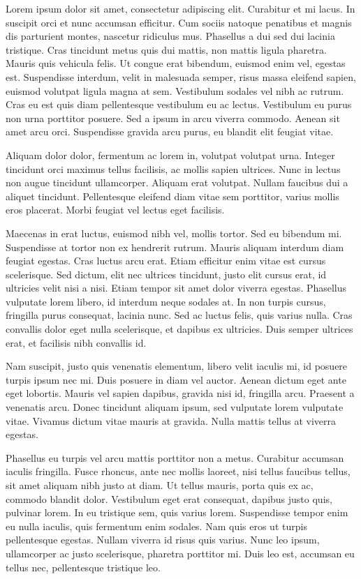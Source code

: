 Lorem ipsum dolor sit amet, consectetur adipiscing elit. Curabitur et mi lacus. In suscipit orci et nunc accumsan efficitur. Cum sociis natoque penatibus et magnis dis parturient montes, nascetur ridiculus mus. Phasellus a dui sed dui lacinia tristique. Cras tincidunt metus quis dui mattis, non mattis ligula pharetra. Mauris quis vehicula felis. Ut congue erat bibendum, euismod enim vel, egestas est. Suspendisse interdum, velit in malesuada semper, risus massa eleifend sapien, euismod volutpat ligula magna at sem. Vestibulum sodales vel nibh ac rutrum. Cras eu est quis diam pellentesque vestibulum eu ac lectus. Vestibulum eu purus non urna porttitor posuere. Sed a ipsum in arcu viverra commodo. Aenean sit amet arcu orci. Suspendisse gravida arcu purus, eu blandit elit feugiat vitae.

Aliquam dolor dolor, fermentum ac lorem in, volutpat volutpat urna. Integer tincidunt orci maximus tellus facilisis, ac mollis sapien ultrices. Nunc in lectus non augue tincidunt ullamcorper. Aliquam erat volutpat. Nullam faucibus dui a aliquet tincidunt. Pellentesque eleifend diam vitae sem porttitor, varius mollis eros placerat. Morbi feugiat vel lectus eget facilisis.

Maecenas in erat luctus, euismod nibh vel, mollis tortor. Sed eu bibendum mi. Suspendisse at tortor non ex hendrerit rutrum. Mauris aliquam interdum diam feugiat egestas. Cras luctus arcu erat. Etiam efficitur enim vitae est cursus scelerisque. Sed dictum, elit nec ultrices tincidunt, justo elit cursus erat, id ultricies velit nisi a nisi. Etiam tempor sit amet dolor viverra egestas. Phasellus vulputate lorem libero, id interdum neque sodales at. In non turpis cursus, fringilla purus consequat, lacinia nunc. Sed ac luctus felis, quis varius nulla. Cras convallis dolor eget nulla scelerisque, et dapibus ex ultricies. Duis semper ultrices erat, et facilisis nibh convallis id.

Nam suscipit, justo quis venenatis elementum, libero velit iaculis mi, id posuere turpis ipsum nec mi. Duis posuere in diam vel auctor. Aenean dictum eget ante eget lobortis. Mauris vel sapien dapibus, gravida nisi id, fringilla arcu. Praesent a venenatis arcu. Donec tincidunt aliquam ipsum, sed vulputate lorem vulputate vitae. Vivamus dictum vitae mauris at gravida. Nulla mattis tellus at viverra egestas.

Phasellus eu turpis vel arcu mattis porttitor non a metus. Curabitur accumsan iaculis fringilla. Fusce rhoncus, ante nec mollis laoreet, nisi tellus faucibus tellus, sit amet aliquam nibh justo at diam. Ut tellus mauris, porta quis ex ac, commodo blandit dolor. Vestibulum eget erat consequat, dapibus justo quis, pulvinar lorem. In eu tristique sem, quis varius lorem. Suspendisse tempor enim eu nulla iaculis, quis fermentum enim sodales. Nam quis eros ut turpis pellentesque egestas. Nullam viverra id risus quis varius. Nunc leo ipsum, ullamcorper ac justo scelerisque, pharetra porttitor mi. Duis leo est, accumsan eu tellus nec, pellentesque tristique leo.

